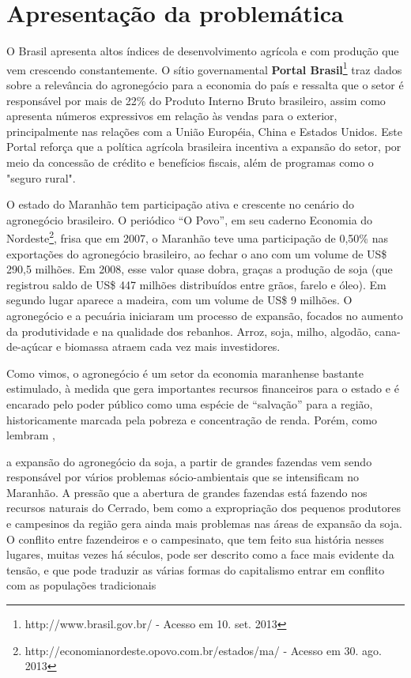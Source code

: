 \chapter{Apresentação da problemática}

O Brasil apresenta altos índices de desenvolvimento agrícola e com produção que vem crescendo constantemente. O sítio governamental \textbf{Portal Brasil}\footnote{http://www.brasil.gov.br/ - Acesso em 10. set. 2013} traz dados sobre a relevância do agronegócio para a economia do país e ressalta que o setor é responsável por mais de 22\% do Produto Interno Bruto brasileiro, assim como apresenta números expressivos em relação às vendas para o exterior, principalmente nas relações com a União Européia, China e Estados Unidos. Este Portal reforça que a política agrícola brasileira incentiva a expansão do setor, por meio da concessão de crédito e benefícios fiscais, além de programas como o "seguro rural".

O estado do Maranhão tem participação ativa e crescente no cenário do agronegócio brasileiro. O periódico “O Povo”, em seu caderno Economia do Nordeste\footnote{http://economianordeste.opovo.com.br/estados/ma/ - Acesso em 30. ago. 2013}, frisa que em 2007, o Maranhão teve uma participação de 0,50\% nas exportações do agronegócio brasileiro, ao fechar o ano com um volume de US\$ 290,5 milhões. Em 2008, esse valor quase dobra, graças a produção de soja (que registrou saldo de US\$ 447 milhões distribuídos entre grãos, farelo e óleo). Em segundo lugar aparece a madeira, com um volume de US\$ 9 milhões. 
O agronegócio e a pecuária iniciaram um processo de expansão, focados no aumento da produtividade e na qualidade dos rebanhos. Arroz, soja, milho, algodão, cana-de-açúcar e biomassa atraem cada vez mais investidores.

Como vimos, o agronegócio é um setor da economia maranhense bastante estimulado, à medida que gera importantes recursos financeiros para o estado e é encarado pelo poder público como uma espécie de “salvação” para a região, historicamente marcada pela pobreza e concentração de renda. Porém, como lembram ,

\begin{citacao}
a expansão do agronegócio da soja, a partir de grandes fazendas vem sendo responsável por vários problemas sócio-ambientais que se intensificam no Maranhão. A pressão que a abertura de grandes fazendas está fazendo nos recursos naturais do Cerrado, bem como a expropriação dos pequenos produtores e campesinos da região gera ainda mais problemas nas áreas de expansão da soja. O conflito entre fazendeiros e o campesinato, que tem feito sua história nesses lugares, muitas vezes há séculos, pode ser descrito como a face mais evidente da tensão, e que pode traduzir as várias formas do capitalismo entrar em conflito com as populações tradicionais \cite[p. 1]{rodrigues_alencar}
\end{citacao}

